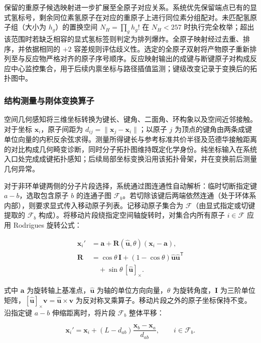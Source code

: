 保留的重原子候选映射进一步扩展至全原子对应关系。系统优先保留端点已有的显式氢标号，剩余同位素氢原子在对应的重原子上进行同位素分组配对。未匹配氢原子组（大小为 $h_g$）的置换空间 $N_H=\prod_g h_g!$ 在 $N_H<257$ 时执行完全枚举；超出该范围时若缺乏相容的显式氢标签则判定为排列爆炸。全原子映射经过去重、排序，并依据相同的 $+2$ 容差规则评估歧义性。选定的全原子双射将产物原子重新排列至与反应物严格对齐的原子序号顺序。反应映射输出的成键与断键原子对构成反应中心监控集合，用于后续内禀坐标与路径插值监测；键级改变记录于变换后的拓扑图中。

\subsubsection{结构测量与刚体变换算子}
空间几何感知将三维坐标转换为键长、键角、二面角、环构象以及空间近邻接触。对于坐标 $\mathbf{x}_i$，原子间距为 $d_{ij}=\|\mathbf{x}_j-\mathbf{x}_i\|$；以原子 $j$ 为顶点的键角由两条成键单位向量的内积反余弦求得。测量所得键长与参考标准共价半径及范德华接触距离的对比构成几何畸变诊断，同时分子拓扑图维持既定化学身份。纯坐标输入在系统入口处完成成键拓扑感知；后续局部坐标变换沿用该拓扑骨架，并在变换前后测量几何异常。

对于非环单键两侧的分子片段选择，系统通过图连通性自动解析：临时切断指定键 $a-b$，选取包含原子 $b$ 的连通子图 $\mathcal{F}_b$。若切除该键后两端依然连通（处于环体系内部），则要求显式传入移动原子列表。记移动原子集合为 $\mathcal{F}$（由显式指定或切键提取的 $\mathcal{F}_b$ 构成）。将移动片段绕指定空间轴旋转时，对集合内所有原子 $i\in\mathcal{F}$ 应用 Rodrigues 旋转公式：

\begin{equation}\label{eq:methods-02}
\begin{aligned}
\mathbf{x}_i'&=\mathbf{a}+\mathbf{R}(\hat{\mathbf{u}},\theta)(\mathbf{x}_i-\mathbf{a}),\\
\mathbf{R}&=\cos\theta\,\mathbf{I}+(1-\cos\theta)\hat{\mathbf{u}}\hat{\mathbf{u}}^{\mathsf{T}}\\
&\quad+\sin\theta\,[\hat{\mathbf{u}}]_\times.
\end{aligned}
\end{equation}

式中 $\mathbf{a}$ 为旋转轴上基准点，$\hat{\mathbf{u}}$ 为轴的单位方向向量，$\theta$ 为旋转角度，$\mathbf{I}$ 为三阶单位矩阵，$[\hat{\mathbf{u}}]_\times\mathbf{v}=\hat{\mathbf{u}}\times\mathbf{v}$ 为反对称叉乘算子。移动片段之外的原子坐标保持不变。沿指定键 $a-b$ 伸缩距离时，将片段 $\mathcal{F}_b$ 整体平移：

\begin{equation}\label{eq:methods-03}
\mathbf{x}_i'=\mathbf{x}_i+(L-d_{ab})\frac{\mathbf{x}_b-\mathbf{x}_a}{d_{ab}},\qquad i\in\mathcal{F}_b.
\end{equation}

